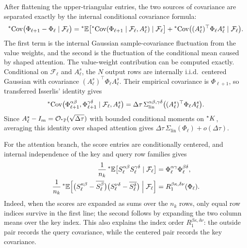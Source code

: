 \begin{proofsketch}
After flattening the upper-triangular entries, the two sources of covariance are separated exactly by the internal conditional covariance formula:
\begin{equation}
\label{eq:ch6-total-cov-decomp}
{}^*\!\operatorname{Cov}\bigl(\Phi_{\ell+1} - \Phi_\ell \mid \mathcal{F}_\ell\bigr)
= {}^*\mathbb{E}\bigl[{}^*\!\operatorname{Cov}(\Phi_{\ell+1} \mid \mathcal{F}_\ell, A_\ell^s) \mid \mathcal{F}_\ell\bigr]
  + {}^*\!\operatorname{Cov}\bigl((A_\ell^s)^\top \Phi_\ell A_\ell^s \mid \mathcal{F}_\ell\bigr).
\end{equation}
The first term is the internal Gaussian sample-covariance fluctuation from the value weights, and the second is the fluctuation of the conditional mean caused by shaped attention. The value-weight contribution can be computed exactly. Conditional on $\mathcal{F}_\ell$ and $A_\ell^s$, the $N$ output rows are internally i.i.d.\ centered Gaussian with covariance $(A_\ell^s)^\top \Phi_\ell A_\ell^s$. Their empirical covariance is $\Phi_{\ell+1}$, so transferred Isserlis' identity gives
\begin{equation}
\label{eq:ch6-value-isserlis}
{}^*\!\operatorname{Cov}\bigl(\Phi_{\ell+1}^{\alpha\beta}, \Phi_{\ell+1}^{\gamma\delta} \mid \mathcal{F}_\ell, A_\ell^s\bigr)
= \Delta\tau\,\Sigma_{\mathrm{lin}}^{\alpha\beta,\gamma\delta}\bigl((A_\ell^s)^\top \Phi_\ell A_\ell^s\bigr).
\end{equation}
Since $A_\ell^s - I_m = \mathcal{O}_{{}^*\mathbb{P}}(\sqrt{\Delta\tau})$ with bounded conditional moments on ${}^*K$, averaging this identity over shaped attention gives $\Delta\tau\,\Sigma_{\mathrm{lin}}(\Phi_\ell) + o(\Delta\tau)$.

For the attention branch, the score entries are conditionally centered, and internal independence of the key and query row families gives
\begin{align}
\frac{1}{n_k}\,{}^*\mathbb{E}\bigl[S_\ell^{\alpha\beta} S_\ell^{\gamma\delta} \mid \mathcal{F}_\ell\bigr] &= \Phi_\ell^{\alpha\gamma} \Phi_\ell^{\beta\delta}, \label{eq:ch6-raw-score-cov} \\
\frac{1}{n_k}\,{}^*\mathbb{E}\Bigl[\bigl(S_\ell^{\kappa\beta} - \overline{S_\ell^\beta}\bigr)\bigl(S_\ell^{\nu\delta} - \overline{S_\ell^\delta}\bigr) \;\Big|\; \mathcal{F}_\ell\Bigr] &= R_1^{\beta\kappa,\delta\nu}(\Phi_\ell). \label{eq:ch6-centered-score-cov}
\end{align}
Indeed, when the scores are expanded as sums over the $n_k$ rows, only equal row indices survive in the first line; the second follows by expanding the two column means over the key index. This also explains the index order $R_1^{\beta\kappa,\delta\nu}$: the outside pair records the query covariance, while the centered pair records the key covariance.


\end{proofsketch}

